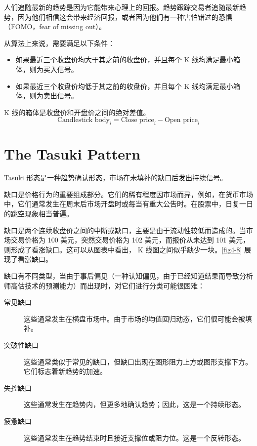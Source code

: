 \begin{tcolorbox}
    人们追随最新的趋势是因为它能带来心理上的回报。趋势跟踪交易者追随最新趋势，因为他们相信这会带来经济回报，或者因为他们有一种害怕错过的恐惧（FOMO，fear of missing out）。
\end{tcolorbox}

从算法上来说，需要满足以下条件：
\begin{itemize}
    \item 如果最近三个收盘价均大于其之前的收盘价，并且每个 K 线均满足最小箱体，则为买入信号。

    \item 如果最近三个收盘价均低于其之前的收盘价，并且每个 K 线均满足最小箱体，则为卖出信号。
\end{itemize}

K 线的箱体是收盘价和开盘价之间的绝对差值。
\begin{equation}
    \text{Candlestick body}_i = \text{Close price}_i - \text{Open price}_i
\end{equation}
\section{The Tasuki Pattern}
Tasuki 形态是一种趋势确认形态，市场在未填补的缺口后发出持续信号。

缺口是价格行为的重要组成部分。它们的稀有程度因市场而异，例如，在货币市场中，它们通常发生在周末后市场开盘时或每当有重大公告时。在股票中，日复一日的跳空现象相当普遍。

缺口是两个连续收盘价之间的中断或缺口，主要是由于流动性较低而造成的。当市场交易价格为 100 美元，突然交易价格为 102 美元，而报价从未达到 101 美元，则形成了看涨缺口。这可以从图表中看出， K 线图之间似乎缺少一块。\autoref{fig4-8} 展现了看涨缺口。


缺口有不同类型，当由于事后偏见（一种认知偏见，由于已经知道结果而导致分析师高估技术的预测能力）而出现时，对它们进行分类可能很困难：

\begin{description}
    \item[常见缺口]这些通常发生在横盘市场中。由于市场的均值回归动态，它们很可能会被填补。
    \item[突破性缺口]这些通常类似于常见的缺口，但缺口出现在图形阻力上方或图形支撑下方。它们标志着新趋势的加速。
    \item[失控缺口]这些通常发生在趋势内，但更多地确认趋势；因此，这是一个持续形态。
    \item[疲惫缺口]这些通常发生在趋势结束时且接近支撑位或阻力位。这是一个反转形态。
\end{description}

